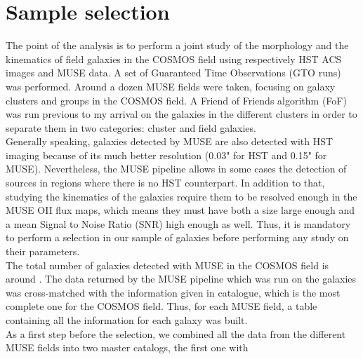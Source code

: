 \clearpage
\section{Sample selection}
\label{sec:Sample_selection}

The point of the analysis is to perform a joint study of the morphology and the kinematics of field galaxies in the COSMOS field using respectively HST ACS images and MUSE data. A set of Guaranteed Time Observations (GTO runs) was performed. Around a dozen MUSE fields were taken, focusing on galaxy clusters and groups in the COSMOS field. A Friend of Friends algorithm (FoF) was run previous to my arrival on the galaxies in the different clusters in order to separate them in two categories: cluster and field galaxies. \\

Generally speaking, galaxies detected by MUSE are also detected with HST imaging because of its much better resolution (0.03" for HST and 0.15" for MUSE). Nevertheless, the MUSE pipeline allows in some cases the detection of sources in regions where there is no HST counterpart. In addition to that, studying the kinematics of the galaxies require them to be resolved enough in the MUSE OII flux maps, which means they must have both a size large enough and a mean Signal to Noise Ratio (SNR) high enough as well. Thus, it is mandatory to perform a selection in our sample of galaxies before performing any study on their parameters. \\

The total number of galaxies detected with MUSE in the COSMOS field is around . The data returned by the MUSE pipeline which was run on the galaxies was cross-matched with the information given in  catalogue, which is the most complete one for the COSMOS field. Thus, for each MUSE field, a table containing all the information for each galaxy was built.\\

As a first step before the selection, we combined all the data from the different MUSE fields into two master catalogs, the first one with

